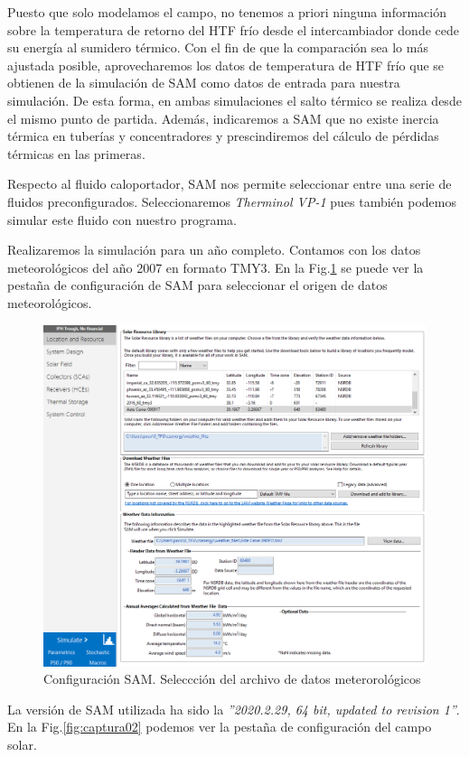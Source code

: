 Puesto que solo modelamos el campo, no tenemos a priori ninguna información sobre la temperatura de retorno del HTF frío desde el intercambiador donde cede su energía al sumidero térmico. Con el fin de que la comparación sea lo más ajustada posible, aprovecharemos los datos de temperatura de HTF frío que se obtienen de la simulación de SAM como datos de entrada para nuestra simulación. De esta forma, en ambas simulaciones el salto térmico se realiza desde el mismo punto de partida. Además, indicaremos a SAM que no existe inercia térmica en tuberías y concentradores y prescindiremos del cálculo de pérdidas térmicas en las primeras.

Respecto al fluido caloportador, SAM nos permite seleccionar entre una serie de fluidos preconfigurados. Seleccionaremos \emph{Therminol VP-1} pues también podemos simular este fluido con nuestro programa.

Realizaremos la simulación para un año completo. Contamos con los datos meteorológicos del año 2007 en formato TMY3.  En la Fig.\ref{fig:captura01} se puede ver la pestaña de configuración de SAM para seleccionar el origen de datos meteorológicos.

\begin{figure}[H]
\includegraphics[width=0.9\linewidth]{images/captura_sam_iph01.png}
\caption{Configuración SAM. Seleccción del archivo de datos meterorológicos} 
\label{fig:captura01}
\end{figure}

La versión de SAM utilizada ha sido la \emph{''2020.2.29, 64 bit, updated to revision 1''}. En la Fig.\ref{fig:captura02} podemos ver la pestaña de configuración del campo solar. 

